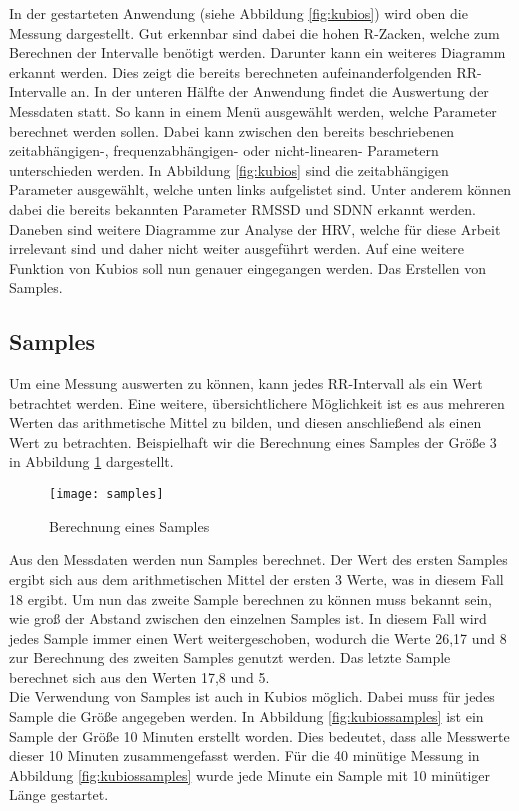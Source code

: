 In der gestarteten Anwendung (siehe Abbildung \ref{fig:kubios}) wird oben die Messung dargestellt. Gut erkennbar sind dabei die hohen R-Zacken, welche zum Berechnen der Intervalle benötigt werden. Darunter kann ein weiteres Diagramm erkannt werden. Dies zeigt die bereits berechneten aufeinanderfolgenden RR-Intervalle an. In der unteren Hälfte der Anwendung findet die Auswertung der Messdaten statt. So kann in einem Menü ausgewählt werden, welche Parameter berechnet werden sollen. Dabei kann zwischen den bereits beschriebenen zeitabhängigen-, frequenzabhängigen- oder nicht-linearen- Parametern unterschieden werden. In Abbildung \ref{fig:kubios} sind die zeitabhängigen Parameter ausgewählt, welche unten links aufgelistet sind. Unter anderem können dabei die bereits bekannten Parameter RMSSD und SDNN erkannt werden. Daneben sind weitere Diagramme zur Analyse der HRV, welche für diese Arbeit irrelevant sind und daher nicht weiter ausgeführt werden. Auf eine weitere Funktion von Kubios soll nun genauer eingegangen werden. Das Erstellen von Samples. \\

\subsection{Samples}
Um eine Messung auswerten zu können, kann jedes RR-Intervall als ein Wert betrachtet werden. Eine weitere, übersichtlichere Möglichkeit ist es aus mehreren Werten das arithmetische Mittel zu bilden, und diesen anschließend als einen Wert zu betrachten. Beispielhaft wir die Berechnung eines Samples der Größe 3 in Abbildung \ref{fig:samples} dargestellt.
 \begin{figure}[H]
	\centering
	\texttt{[image: samples]}
	\caption{Berechnung eines Samples}
	\label{fig:samples}
\end{figure}
Aus den Messdaten werden nun Samples berechnet. Der Wert des ersten Samples ergibt sich aus dem arithmetischen Mittel der ersten 3 Werte, was in diesem Fall 18 ergibt. Um nun das zweite Sample berechnen zu können muss bekannt sein, wie groß der Abstand zwischen den einzelnen Samples ist. In diesem Fall wird jedes Sample immer einen Wert weitergeschoben, wodurch die Werte 26,17 und 8 zur Berechnung des zweiten Samples genutzt werden. Das letzte Sample berechnet sich aus den Werten 17,8 und 5.\\

Die Verwendung von Samples ist auch in Kubios möglich. Dabei muss für jedes Sample  die Größe angegeben werden. In Abbildung \ref{fig:kubiossamples} ist ein Sample der Größe 10 Minuten erstellt worden. Dies bedeutet, dass alle Messwerte dieser 10 Minuten zusammengefasst werden. Für die 40 minütige Messung in Abbildung \ref{fig:kubiossamples} wurde jede Minute ein Sample mit 10 minütiger Länge gestartet.\\

